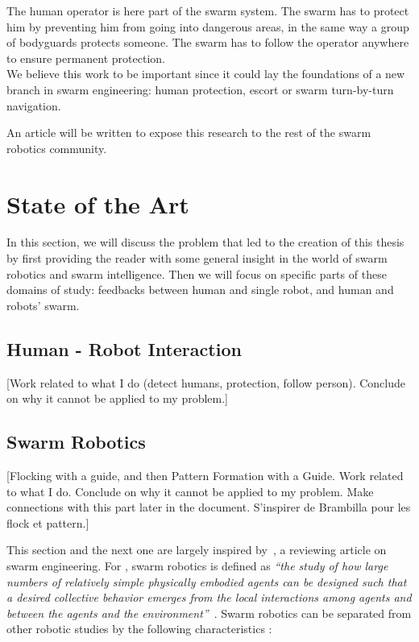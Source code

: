 \documentclass[oneside, a4paper, 12pt]{memoir}
\newcommand{\quot}[1]{\textit{\enquote{#1}}}
\begin{document}
	The human operator is here part of the swarm system. The swarm has to protect him by preventing him from going into dangerous areas, in the same way a group of bodyguards protects someone. The swarm has to follow the operator anywhere to ensure permanent protection.\\
	
	We believe this work to be important since it could lay the foundations of a new branch in swarm engineering: human protection, escort or swarm turn-by-turn navigation.
	
	An article will be written to expose this research to the rest of the swarm robotics community.

\chapter{State of the Art}
	
	In this section, we will discuss the problem that led to the creation of this thesis by first providing the reader with some general insight in the world of swarm robotics and swarm intelligence. Then we will focus on specific parts of these domains of study: feedbacks between human and single robot, and human and robots' swarm.
	
	\section{Human - Robot Interaction}
	
	[Work related to what I do (detect humans, protection, follow person). Conclude on why it cannot be applied to my problem.]

	\section{Swarm Robotics}
	
	[Flocking with a guide, and then Pattern Formation with a Guide. Work related to what I do. Conclude on why it cannot be applied to my problem. Make connections with this part later in the document. S'inspirer de Brambilla pour les flock et pattern.]
	
	This section and the next one are largely inspired by~\citet{brambilla2013swarm}, a reviewing article on swarm engineering. For \citet{csahin2005swarm}, swarm robotics is defined as \quot{the study of how large numbers of relatively simple physically embodied agents can be designed such that a desired collective behavior emerges from the local interactions among agents and between the agents and the environment}~\citep{csahin2005swarm}. Swarm robotics can be separated from other robotic studies by the following characteristics \citep{brambilla2013swarm}:
	
\end{document}
